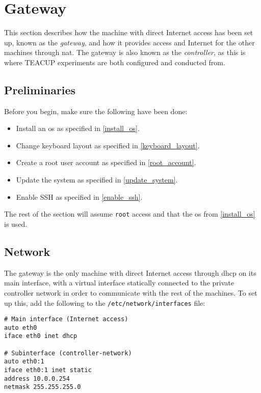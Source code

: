 \chapter{Gateway}

This section describes how the machine with direct Internet access has been set up, known as the \textit{gateway}, and how it provides access and Internet for the other machines through \gls{nat}. The gateway is also known as the \textit{controller}, as this is where TEACUP experiments are both configured and conducted from.

\section{Preliminaries}

Before you begin, make sure the following have been done:

\begin{itemize}
    \item Install an \gls{os} as specified in \ref{install_os}.
    \item Change keyboard layout as specified in \ref{keyboard_layout}.
    \item Create a root user account as specified in \ref{root_account}.
    \item Update the system as specified in \ref{update_system}.
    \item Enable SSH as specified in \ref{enable_ssh}.
\end{itemize}

The rest of the section will assume \lstinline{root} access and that the \gls{os} from \ref{install_os} is used.


\section{Network}

The gateway is the only machine with direct Internet access through \gls{dhcp} on its main interface, with a virtual interface statically connected to the private controller network in order to communicate with the rest of the machines. To set up this, add the following to the \lstinline{/etc/network/interfaces} file:

\begin{verbatim}
# Main interface (Internet access)
auto eth0
iface eth0 inet dhcp

# Subinterface (controller-network)
auto eth0:1
iface eth0:1 inet static
address 10.0.0.254
netmask 255.255.255.0
\end{verbatim}

